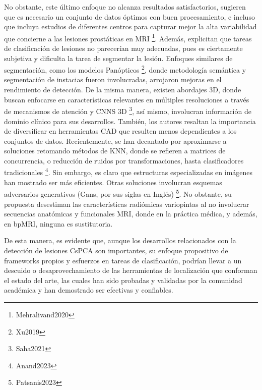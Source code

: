 No obstante, este último enfoque no alcanza resultados satisfactorios, sugieren que es necesario un conjunto de datos óptimos con buen procesamiento, e incluso que incluya estudios de diferentes centros para capturar mejor la alta variabilidad que concierne a las lesiones prostáticas en MRI \footnote{Mehralivand2020}. Además, explicitan que tareas de clasificación de lesiones no parecerían muy adecuadas, pues es ciertamente subjetiva y dificulta la tarea de segmentar la lesión.
Enfoques similares de segmentación, como los modelos Panópticos \footnote{Xu2019}, donde metodología semántica y segmentación de instacias fueron involucradas, arrojaron mejoras en el rendimiento de detección. 
De la misma manera, existen abordajes 3D, donde buscan enfocarse en características relevantes en múltiples resoluciones a través de mecanismos de atención y CNNS 3D \footnote{Saha2021}, así mismo, involucran información de dominio clínico para sus desarrollos. También, los autores resaltan la importancia de diversificar en herramientas CAD que resulten menos dependientes a los conjuntos de datos. Recientemente, se han decantado por aproximarse a soluciones retomando métodos de KNN, donde se refieren a  matrices de concurrencia, o reducción de ruidos por transformaciones, hasta clasificadores tradicionales \footnote{Anand2023}. Sin embargo, es claro que estructuras especializadas en imágenes han mostrado ser más eficientes. Otras soluciones involucran esquemas adversarios-generativos (Gans, por sus siglas en Inglés) \footnote{Patsanis2023}. No obstante, su propuesta desestiman las características radiómicas variopintas al no involucrar secuencias anatómicas y funcionales MRI, donde en la práctica médica, y además, en bpMRI, ninguna es sustitutoria.\par De esta manera, es evidente que, aunque los desarrollos relacionados con la detección de lesiones CsPCA son importantes, su enfoque propositivo de frameworks propios y esfuerzos en tareas de clasificación, podrían llevar a un descuido o desaprovechamiento de las herramientas de localización que conforman el estado del arte, las cuales han sido probadas y validadas por la comunidad académica y han demostrado ser efectivas y confiables.\pagebreak
